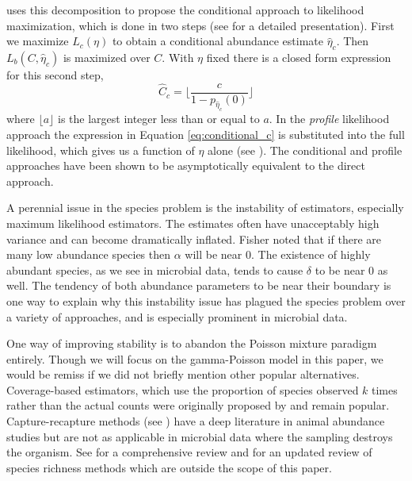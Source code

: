 \documentclass[oupdraft]{bio}
\begin{document}
\citet{sanathanan_1977} uses this decomposition to propose the conditional approach to likelihood maximization, which is done in two steps (see \citet{chao_2002} for a detailed presentation).  First we maximize $L_c(\eta)$ to obtain a conditional abundance estimate $\widehat{\eta}_c$.  Then $L_b(C, \widehat{\eta}_c)$ is maximized over $C$.  With $\eta$ fixed there is a closed form expression for this second step,
\begin{equation}
\widehat{C}_c = \Biggl\lfloor \frac{c}{1-p_{\widehat{\eta}_c}(0)} \Biggr\rfloor \label{eq:conditional_c}
\end{equation}
where $\lfloor a \rfloor$ is the largest integer less than or equal to $a$.  In the \textit{profile} likelihood approach the expression in Equation \ref{eq:conditional_c} is substituted into the full likelihood, which gives us a function of $\eta$ alone (see \citet{wang_2005}).  The conditional and profile approaches have been shown to be asymptotically equivalent to the direct approach.

A perennial issue in the species problem is the instability of estimators, especially maximum likelihood estimators.  The estimates often have unacceptably high variance and can become dramatically inflated.  Fisher noted that if there are many low abundance species then $\alpha$ will be near 0.  The existence of highly abundant species, as we see in microbial data, tends to cause $\delta$ to be near 0 as well.  The tendency of both abundance parameters to be near their boundary is one way to explain why this instability issue has plagued the species problem over a variety of approaches, and is especially prominent in microbial data.

One way of improving stability is to abandon the Poisson mixture paradigm entirely.  Though we will focus on the gamma-Poisson model in this paper, we would be remiss if we did not briefly mention other popular alternatives.  Coverage-based estimators, which use the proportion of species observed $k$ times rather than the actual counts were originally proposed by \citet{good_1953} and remain popular.  Capture-recapture methods (see \citet{chao_1987}) have a deep literature in animal abundance studies but are not as applicable in microbial data where the sampling  destroys the organism.  See \citet{bunge_1993} for a comprehensive review and \citet{bunge_2014} for an updated review of species richness methods which are outside the scope of this paper.
\end{document}
